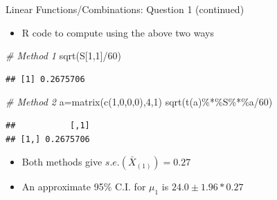 \documentclass[
  ignorenonframetext,
]{beamer}
\newenvironment{Shaded}{\begin{snugshade}}{\end{snugshade}}
\newcommand{\CommentTok}[1]{\textcolor[rgb]{0.56,0.35,0.01}{\textit{#1}}}
\newcommand{\DecValTok}[1]{\textcolor[rgb]{0.00,0.00,0.81}{#1}}
\newcommand{\FunctionTok}[1]{\textcolor[rgb]{0.00,0.00,0.00}{#1}}
\newcommand{\NormalTok}[1]{#1}
\newcommand{\OtherTok}[1]{\textcolor[rgb]{0.56,0.35,0.01}{#1}}
\newcommand{\SpecialCharTok}[1]{\textcolor[rgb]{0.00,0.00,0.00}{#1}}
\providecommand{\tightlist}{%
  \setlength{\itemsep}{0pt}\setlength{\parskip}{0pt}}
\begin{document}
\begin{frame}[fragile]{Linear Functions/Combinations: Question 1
(continued)}
\protect\hypertarget{linear-functionscombinations-question-1-continued}{}
\begin{itemize}
\tightlist
\item
  R code to compute using the above two ways
\end{itemize}

\begin{Shaded}
\begin{Highlighting}[]
\CommentTok{\# Method 1}
\FunctionTok{sqrt}\NormalTok{(S[}\DecValTok{1}\NormalTok{,}\DecValTok{1}\NormalTok{]}\SpecialCharTok{/}\DecValTok{60}\NormalTok{)}
\end{Highlighting}
\end{Shaded}

\begin{verbatim}
## [1] 0.2675706
\end{verbatim}

\begin{Shaded}
\begin{Highlighting}[]
\CommentTok{\# Method 2}
\NormalTok{a}\OtherTok{=}\FunctionTok{matrix}\NormalTok{(}\FunctionTok{c}\NormalTok{(}\DecValTok{1}\NormalTok{,}\DecValTok{0}\NormalTok{,}\DecValTok{0}\NormalTok{,}\DecValTok{0}\NormalTok{),}\DecValTok{4}\NormalTok{,}\DecValTok{1}\NormalTok{)}
\FunctionTok{sqrt}\NormalTok{(}\FunctionTok{t}\NormalTok{(a)}\SpecialCharTok{\%*\%}\NormalTok{S}\SpecialCharTok{\%*\%}\NormalTok{a}\SpecialCharTok{/}\DecValTok{60}\NormalTok{)}
\end{Highlighting}
\end{Shaded}

\begin{verbatim}
##           [,1]
## [1,] 0.2675706
\end{verbatim}

\begin{itemize}
\tightlist
\item
  Both methods give \(s.e.(\bar X_{(1)})=0.27\)
\item
  An approximate 95\% C.I. for \(\mu_1\) is \(24.0 \pm 1.96*0.27\)
\end{itemize}
\end{frame}
\end{document}
